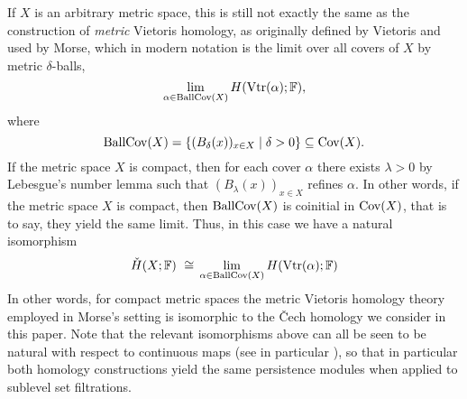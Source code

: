 If $X$ is an arbitrary metric space, this is still not exactly the same as the construction of \emph{metric} Vietoris homology, as originally defined by Vietoris \cite{Vietoris.1927} and used by Morse, which in modern notation is the limit over all covers of $X$ by metric $\delta$-balls,
\begin{equation*}
\lim_{\alpha \in \operatorname{BallCov}(X)} H (\operatorname{Vtr} (\alpha); \mathbb{F}),
\end{equation*}
where
\begin{equation*}
\operatorname{BallCov} (X) = \left\{ ( B_{\delta} (x) )_{x \in X} \mid \delta > 0 \right\}
\subseteq \operatorname{Cov} (X).
\end{equation*}
If the metric space $X$ is compact, then for each cover $\alpha$ there exists $\lambda > 0$ by Lebesgue's number lemma such that $(B_{\lambda}(x))_{x \in X}$ refines $\alpha$.
In other words, if the metric space $X$ is compact, then $\operatorname{BallCov} (X)$ is coinitial in $\operatorname{Cov} (X)$, that is to say, they yield the same limit.
Thus, in this case we have a natural isomorphism
\begin{equation*}
\check{H} (X; \mathbb{F}) \ \cong \,
\lim_{\alpha \in \operatorname{BallCov}(X)} H (\operatorname{Vtr} (\alpha); \mathbb{F})
\end{equation*}
In other words, for compact metric spaces the metric Vietoris homology theory employed in Morse's setting is isomorphic to the \v{C}ech homology we consider in this paper.
Note that the relevant isomorphisms above can all be seen to be natural with respect to continuous maps (see in particular \cite[Lemma 7a]{Dowker.1952}), so that in particular both homology constructions yield the same persistence modules when applied to sublevel set filtrations.
